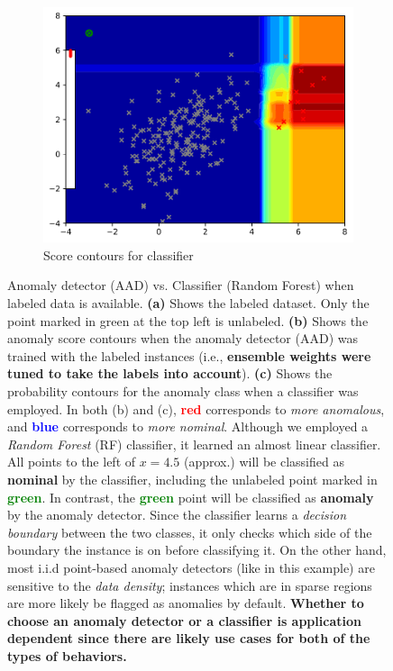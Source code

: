 \documentclass{article} %
\begin{document}
\begin{figure}
\begin{subfigure}[b]{0.3\textwidth}
    	\includegraphics[width=\textwidth, clip=true, trim=0mm 0mm 0mm 0mm]{avc_train_classifier}
    	\caption{Score contours for classifier}
    	\label{fig:rf}
    \end{subfigure}
	\caption{Anomaly detector (AAD) vs. Classifier (Random Forest) when labeled data is available. {\bf (a)} Shows the labeled dataset. Only the point marked in green at the top left is unlabeled. {\bf (b)} Shows the anomaly score contours when the anomaly detector (AAD) was trained with the labeled instances (i.e., \textbf{ensemble weights were tuned to take the labels into account}). {\bf (c)} Shows the probability contours for the anomaly class when a classifier was employed. In both (b) and (c), \textcolor{red}{\textbf{red}} corresponds to \textit{more anomalous}, and \textcolor{blue}{\textbf{blue}} corresponds to \textit{more nominal}. Although we employed a \textit{Random Forest} (RF) classifier, it learned an almost linear classifier. All points to the left of $x=4.5$ (approx.) will be classified as \textbf{nominal} by the classifier, including the unlabeled point marked in \textcolor{green}{\textbf{green}}. In contrast, the \textcolor{green}{\textbf{green}} point will be classified as \textbf{anomaly} by the anomaly detector. Since the classifier learns a \textit{decision boundary} between the two classes, it only checks which side of the boundary the instance is on before classifying it. On the other hand, most i.i.d point-based anomaly detectors (like in this example) are sensitive to the \textit{data density}; instances which are in sparse regions are more likely be flagged as anomalies by default. \textbf{Whether to choose an anomaly detector or a classifier is application dependent since there are likely use cases for both of the types of behaviors.}}
	\label{fig:regression}
\end{figure}
\end{document}
